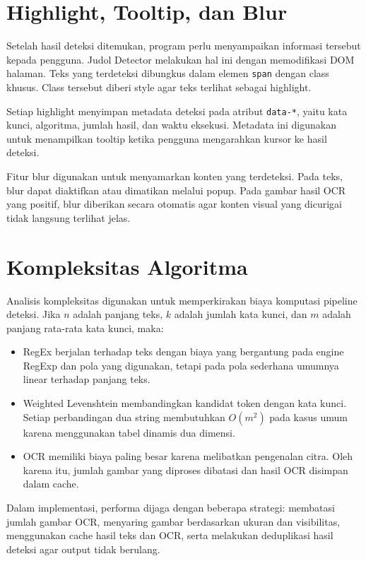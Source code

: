\section{Highlight, Tooltip, dan Blur}

Setelah hasil deteksi ditemukan, program perlu menyampaikan informasi tersebut
kepada pengguna. Judol Detector melakukan hal ini dengan memodifikasi DOM
halaman. Teks yang terdeteksi dibungkus dalam elemen \texttt{span} dengan class
khusus. Class tersebut diberi style agar teks terlihat sebagai highlight.

Setiap highlight menyimpan metadata deteksi pada atribut \texttt{data-*}, yaitu
kata kunci, algoritma, jumlah hasil, dan waktu eksekusi. Metadata ini digunakan
untuk menampilkan tooltip ketika pengguna mengarahkan kursor ke hasil deteksi.

Fitur blur digunakan untuk menyamarkan konten yang terdeteksi. Pada teks, blur
dapat diaktifkan atau dimatikan melalui popup. Pada gambar hasil OCR yang
positif, blur diberikan secara otomatis agar konten visual yang dicurigai tidak
langsung terlihat jelas.

\section{Kompleksitas Algoritma}

Analisis kompleksitas digunakan untuk memperkirakan biaya komputasi pipeline
deteksi. Jika $n$ adalah panjang teks, $k$ adalah jumlah kata kunci, dan $m$
adalah panjang rata-rata kata kunci, maka:

\begin{itemize}
    \item RegEx berjalan terhadap teks dengan biaya yang bergantung pada engine
    RegExp dan pola yang digunakan, tetapi pada pola sederhana umumnya linear
    terhadap panjang teks.
    \item Weighted Levenshtein membandingkan kandidat token dengan kata kunci.
    Setiap perbandingan dua string membutuhkan $O(m^2)$ pada kasus umum karena
    menggunakan tabel dinamis dua dimensi.
    \item OCR memiliki biaya paling besar karena melibatkan pengenalan citra.
    Oleh karena itu, jumlah gambar yang diproses dibatasi dan hasil OCR
    disimpan dalam cache.
\end{itemize}

Dalam implementasi, performa dijaga dengan beberapa strategi: membatasi jumlah
gambar OCR, menyaring gambar berdasarkan ukuran dan visibilitas, menggunakan
cache hasil teks dan OCR, serta melakukan deduplikasi hasil deteksi agar output
tidak berulang.
